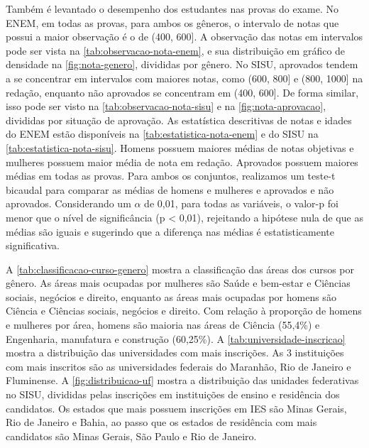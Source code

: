 Também é levantado o desempenho dos estudantes nas provas do exame. No ENEM, em todas as provas, para ambos os gêneros, o intervalo de notas que possui a maior observação é o de (400, 600]. A observação das notas em intervalos pode ser vista na \autoref{tab:observacao-nota-enem}, e sua distribuição em gráfico de densidade na \autoref{fig:nota-genero}, divididas por gênero. No SISU, aprovados tendem a se concentrar em intervalos com maiores notas, como (600, 800] e (800, 1000] na redação, enquanto não aprovados se concentram em (400, 600]. De forma similar, isso pode ser visto na \autoref{tab:observacao-nota-sisu} e na \autoref{fig:nota-aprovacao}, divididas por situação de aprovação. As estatística descritivas de notas e idades do ENEM estão disponíveis na \autoref{tab:estatistica-nota-enem} e do SISU na \autoref{tab:estatistica-nota-sisu}. Homens possuem maiores médias de notas objetivas e mulheres possuem maior média de nota em redação. Aprovados possuem maiores médias em todas as provas. Para ambos os conjuntos, realizamos um teste-t bicaudal para comparar as médias de homens e mulheres e aprovados e não aprovados. Considerando um $\alpha$ de 0,01, para todas as variáveis, o valor-p foi menor que o nível de significância (p < 0,01), rejeitando a hipótese nula de que as médias são iguais e sugerindo que a diferença nas médias é estatisticamente significativa.

A \autoref{tab:classificacao-curso-genero} mostra a classificação das áreas dos cursos por gênero. As áreas mais ocupadas por mulheres são Saúde e bem-estar e Ciências sociais, negócios e direito, enquanto as áreas mais ocupadas por homens são Ciência e Ciências sociais, negócios e direito. Com relação à proporção de homens e mulheres por área, homens são maioria nas áreas de Ciência (55,4\%) e Engenharia, manufatura e construção (60,25\%). A \autoref{tab:universidade-inscricao} mostra a distribuição das universidades com mais inscrições. As 3 instituições com mais inscritos são as universidades federais do Maranhão, Rio de Janeiro e Fluminense. A \autoref{fig:distribuicao-uf} mostra a distribuição das unidades federativas no SISU, divididas pelas inscrições em instituições de ensino e residência dos candidatos. Os estados que mais possuem inscrições em IES são Minas Gerais, Rio de Janeiro e Bahia, ao passo que os estados de residência com mais candidatos são Minas Gerais, São Paulo e Rio de Janeiro. 
   
